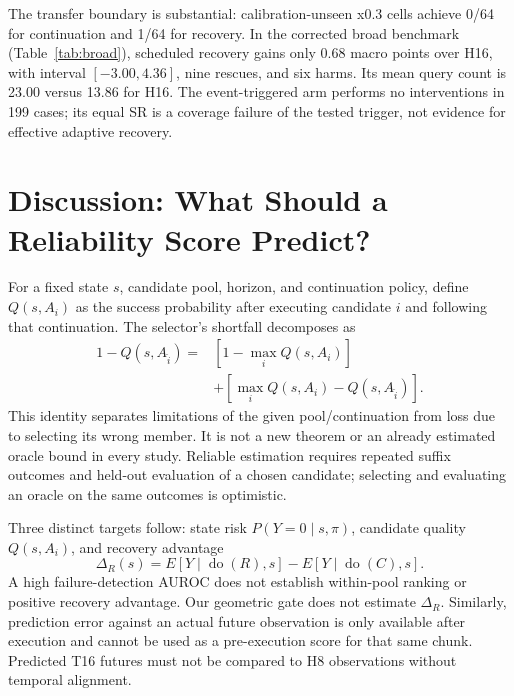 The transfer boundary is substantial: calibration-unseen x0.3 cells achieve
0/64 for continuation and 1/64 for recovery. In the corrected broad benchmark
(Table~\ref{tab:broad}), scheduled recovery gains only 0.68 macro points
over H16, with interval $[-3.00,4.36]$, nine rescues, and six harms.
Its mean query count is 23.00 versus 13.86 for H16. The event-triggered arm
performs no interventions in 199 cases; its equal SR is a coverage failure
of the tested trigger, not evidence for effective adaptive recovery.

\begin{table}[t]
\centering\footnotesize
\caption{Corrected-runtime broad Cosmos comparison. Object/Environment/
Position have 50/50/99 cases. Macro-SR is the equal-factor average, not
successes divided by 199.}
\label{tab:broad}

\end{table}

\ScopedRuntimeResults
\ScopedAblationResults

\section{Discussion: What Should a Reliability Score Predict?}
For a fixed state $s$, candidate pool, horizon, and continuation policy,
define $Q(s,A_i)$ as the success probability after executing candidate $i$
and following that continuation. The selector's shortfall decomposes as
\begin{equation}
\begin{split}
1-Q(s,A_{\hat i})={}&[1-\max_i Q(s,A_i)]\\
&+[\max_i Q(s,A_i)-Q(s,A_{\hat i})].
\end{split}
\end{equation}
This identity separates limitations of the given pool/continuation from
loss due to selecting its wrong member. It is not a new theorem or an
already estimated oracle bound in every study. Reliable estimation requires
repeated suffix outcomes and held-out evaluation of a chosen candidate;
selecting and evaluating an oracle on the same outcomes is optimistic.

Three distinct targets follow: state risk $P(Y=0\mid s,\pi)$, candidate
quality $Q(s,A_i)$, and recovery advantage
\begin{equation}
\Delta_R(s)=E[Y\mid\operatorname{do}(R),s]
-E[Y\mid\operatorname{do}(C),s].
\end{equation}
A high failure-detection AUROC does not establish within-pool ranking
or positive recovery advantage. Our geometric gate does not estimate
$\Delta_R$. Similarly, prediction error against an actual future observation
is only available after execution and cannot be used as a pre-execution
score for that same chunk. Predicted T16 futures must not be compared to
H8 observations without temporal alignment.

